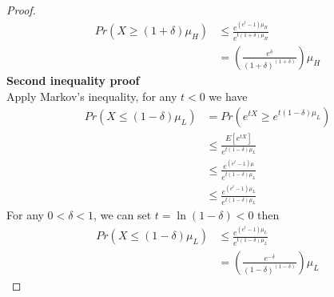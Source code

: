 \begin{proof}
\begin{equation*}
\begin{split}
Pr(X \ge (1+\delta) \mu_H) &\le \frac{e^{(e^t-1)\mu_H}}{e^{t(1+\delta)\mu_H}} \\
&= \left(\frac{e^\delta}{(1+\delta)^{(1+\delta)}}\right) \mu_H
\end{split}
\end{equation*}
\textbf{Second inequality proof}\\
Apply Markov's inequality, for any $t<0$ we have
\begin{equation*}
\begin{split}
Pr(X \le (1-\delta) \mu_L) &= Pr\left(e^{tX} \ge e^{t(1-\delta)\mu_L}\right)\\
&\le \frac{E[e^{tX}]}{e^{t(1-\delta)\mu_L}} \\
&\le \frac{e^{(e^t-1)\mu}}{e^{t(1-\delta)\mu_L}} \\
&\le \frac{e^{(e^t-1)\mu_L}}{e^{t(1-\delta)\mu_L}}
\end{split}
\end{equation*}
For any $0<\delta<1$, we can set $t=\ln(1-\delta)<0$ then
\begin{equation*}
\begin{split}
Pr(X \le (1-\delta) \mu_L) &\le \frac{e^{(e^t-1)\mu_L}}{e^{t(1-\delta)\mu_L}} \\
&= \left(\frac{e^{-\delta}}{(1-\delta)^{(1-\delta)}}\right) \mu_L
\end{split}
\end{equation*}
\end{proof}

